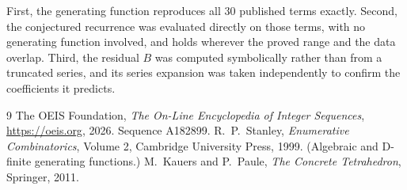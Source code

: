 \documentclass[11pt,a4paper]{article}
\theoremstyle{plain}
\theoremstyle{definition}
\begin{document}
First, the generating function reproduces all $30$ published terms exactly. Second,
the conjectured recurrence was evaluated directly on those terms, with no generating function
involved, and holds wherever the proved range and the data overlap. Third, the residual $B$ was
computed symbolically rather than from a truncated series, and its series expansion was taken
independently to confirm the coefficients it predicts.

\begin{thebibliography}{9}
 The OEIS Foundation, \emph{The On-Line Encyclopedia of Integer Sequences},
\url{https://oeis.org}, 2026. Sequence A182899.
 R.~P.~Stanley, \emph{Enumerative Combinatorics}, Volume 2, Cambridge
University Press, 1999. (Algebraic and D-finite generating functions.)
 M.~Kauers and P.~Paule, \emph{The Concrete Tetrahedron}, Springer, 2011.
\end{thebibliography}
\end{document}
